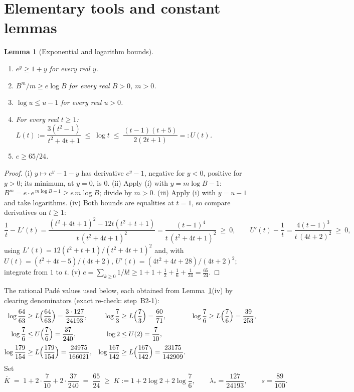\documentclass[11pt]{amsart}
\newtheorem{lemma}[theorem]{Lemma}
\theoremstyle{remark}
\begin{document}
\section{Elementary tools and constant lemmas}\label{sec:tools}

\begin{lemma}[Exponential and logarithm bounds]\label{lem:tools}
\begin{enumerate}[label=\textup{(\roman*)}]
\item $e^{y}\ge1+y$ for every real $y$.
\item $B^m/m\ge e\log B$ for every real $B>0$, $m>0$.
\item $\log u\le u-1$ for every real $u>0$.
\item For every real $t\ge1$:
$L(t):=\dfrac{3(t^2-1)}{t^2+4t+1}\;\le\;\log t\;\le\;\dfrac{(t-1)(t+5)}{2(2t+1)}=:U(t)$.
\item $e\ge65/24$.
\end{enumerate}
\end{lemma}

\begin{proof}
(i) $y\mapsto e^y-1-y$ has derivative $e^y-1$, negative for $y<0$, positive for $y>0$; its minimum, at $y=0$, is $0$.
(ii) Apply (i) with $y=m\log B-1$: $B^m=e\cdot e^{\,m\log B-1}\ge e\,m\log B$; divide by $m>0$.
(iii) Apply (i) with $y=u-1$ and take logarithms.
(iv) Both bounds are equalities at $t=1$, so compare derivatives on $t\ge1$:
\[
        \frac{1}{t}-L'(t)
        =\frac{(t^2+4t+1)^2-12t(t^2+t+1)}{t\,(t^2+4t+1)^2}
        =\frac{(t-1)^4}{t\,(t^2+4t+1)^2}\ \ge\ 0,
\qquad
        U'(t)-\frac1t
        =\frac{4(t-1)^3}{t\,(4t+2)^2}\ \ge\ 0,
\]
using $L'(t)=12(t^2+t+1)/(t^2+4t+1)^2$ and, with $U(t)=(t^2+4t-5)/(4t+2)$, $U'(t)=(4t^2+4t+28)/(4t+2)^2$; integrate from $1$ to $t$.
(v) $e=\sum_{k\ge0}1/k!\ge1+1+\frac12+\frac16+\frac1{24}=\frac{65}{24}$.
\end{proof}

The rational Pad\'e values used below, each obtained from Lemma~\ref{lem:tools}(iv) by clearing denominators (exact re-check: step~B2-1):
\begin{equation}\label{eq:pade}
\begin{aligned}
        \log\frac{64}{63}&\ge L\Bigl(\frac{64}{63}\Bigr)=\frac{3\cdot127}{24193},
        &\log\frac73&\ge L\Bigl(\frac73\Bigr)=\frac{60}{71},
        &\log\frac76&\ge L\Bigl(\frac76\Bigr)=\frac{39}{253},
        \\[1mm]
        \log\frac76&\le U\Bigl(\frac76\Bigr)=\frac{37}{240},
        &\log2&\le U(2)=\frac7{10},
        &&
        \\[1mm]
        \log\frac{179}{154}&\ge L\Bigl(\frac{179}{154}\Bigr)=\frac{24975}{166021},
        &\log\frac{167}{142}&\ge L\Bigl(\frac{167}{142}\Bigr)=\frac{23175}{142909}.
        &&
\end{aligned}
\end{equation}
Set
\begin{equation}\label{eq:Kbar}
        \overline K\;=\;1+2\cdot\frac7{10}+2\cdot\frac{37}{240}
        \;=\;\frac{65}{24}
        \;\ge\;K:=1+2\log2+2\log\frac76 ,
        \qquad
        \lambda_*=\frac{127}{24193},
        \qquad
        s=\frac{89}{100}.
\end{equation}
\end{document}
